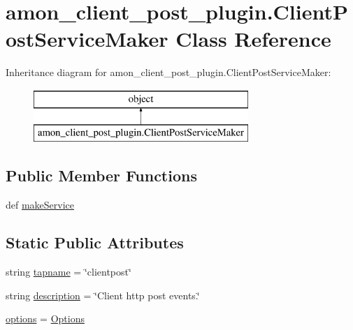 \hypertarget{classamon__client__post__plugin_1_1_client_post_service_maker}{\section{amon\-\_\-client\-\_\-post\-\_\-plugin.\-Client\-Post\-Service\-Maker Class Reference}
\label{classamon__client__post__plugin_1_1_client_post_service_maker}
}
Inheritance diagram for amon\-\_\-client\-\_\-post\-\_\-plugin.\-Client\-Post\-Service\-Maker\-:\begin{figure}[H]
\begin{center}
\leavevmode
\includegraphics[height=2.000000cm]{classamon__client__post__plugin_1_1_client_post_service_maker}
\end{center}
\end{figure}
\subsection*{Public Member Functions}
\begin{DoxyCompactItemize}
\item 
def \hyperlink{classamon__client__post__plugin_1_1_client_post_service_maker_aa80a4a64acaf47b4676b3d13adc7f084}{make\-Service}
\end{DoxyCompactItemize}
\subsection*{Static Public Attributes}
\begin{DoxyCompactItemize}
\item 
string \hyperlink{classamon__client__post__plugin_1_1_client_post_service_maker_ae6514d6e442e3e0855d2e474d3ec09a5}{tapname} = \char`\"{}clientpost\char`\"{}
\item 
string \hyperlink{classamon__client__post__plugin_1_1_client_post_service_maker_ac1d97b2b87e84d746bff8f68179b443a}{description} = \char`\"{}Client http post events.\char`\"{}
\item 
\hyperlink{classamon__client__post__plugin_1_1_client_post_service_maker_a24da49904f7a79f0d43139c68228d96d}{options} = \hyperlink{classamon__client__post__plugin_1_1_options}{Options}
\end{DoxyCompactItemize}


